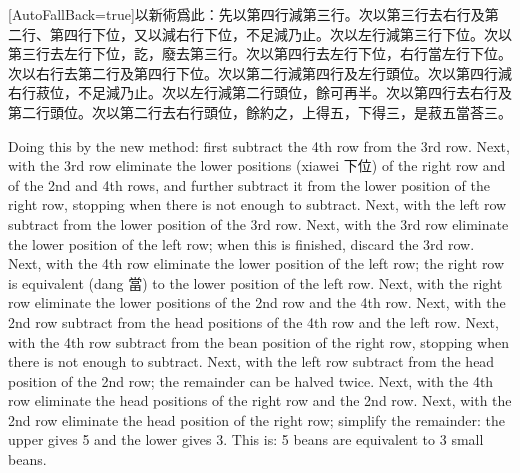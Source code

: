 \documentclass[11pt]{article}
\newcommand{\unitlabel}[1]{\marginpar{\raggedleft\tiny\color{gray}#1}}
\newenvironment{unitzh}{\par\CJKfontspec{Noto Serif CJK SC}[AutoFallBack=true]\large\linespread{1.25}\selectfont}{\par}
\newenvironment{uniten}{\par\small\color{black!85}}{\par\medskip}
\begin{document}
\begin{unitzh}\unitlabel{jiuzhang-037.8}以新術爲此：先以第四行減第三行。次以第三行去右行及第二行、第四行下位，又以減右行下位，不足減乃止。次以左行減第三行下位。次以第三行去左行下位，訖，廢去第三行。次以第四行去左行下位，右行當左行下位。次以右行去第二行及第四行下位。次以第二行減第四行及左行頭位。次以第四行減右行菽位，不足減乃止。次以左行減第二行頭位，餘可再半。次以第四行去右行及第二行頭位。次以第二行去右行頭位，餘約之，上得五，下得三，是菽五當荅三。\end{unitzh}
\begin{uniten}Doing this by the new method: first subtract the 4th row from the 3rd row. Next, with the 3rd row eliminate the lower positions (xiawei 下位) of the right row and of the 2nd and 4th rows, and further subtract it from the lower position of the right row, stopping when there is not enough to subtract. Next, with the left row subtract from the lower position of the 3rd row. Next, with the 3rd row eliminate the lower position of the left row; when this is finished, discard the 3rd row. Next, with the 4th row eliminate the lower position of the left row; the right row is equivalent (dang 當) to the lower position of the left row. Next, with the right row eliminate the lower positions of the 2nd row and the 4th row. Next, with the 2nd row subtract from the head positions of the 4th row and the left row. Next, with the 4th row subtract from the bean position of the right row, stopping when there is not enough to subtract. Next, with the left row subtract from the head position of the 2nd row; the remainder can be halved twice. Next, with the 4th row eliminate the head positions of the right row and the 2nd row. Next, with the 2nd row eliminate the head position of the right row; simplify the remainder: the upper gives 5 and the lower gives 3. This is: 5 beans are equivalent to 3 small beans.\end{uniten}
\end{document}
